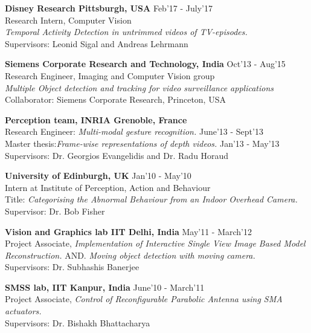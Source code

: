 \documentclass[line, margin]{res}
\begin{document}
\begin{resume}
\textbf{Disney Research Pittsburgh, USA} \hfill Feb'17 - July'17 \\
Research Intern, Computer Vision\\
\emph{Temporal Activity Detection in untrimmed videos of TV-episodes.}\\
Supervisors: Leonid Sigal and Andreas Lehrmann 

\textbf{Siemens Corporate Research and Technology, India} \hfill Oct'13 - Aug'15 \\
Research Engineer, Imaging and Computer Vision group\\
\emph{Multiple Object detection and tracking for video surveillance applications}\\
Collaborator: Siemens Corporate Research, Princeton, USA 

\textbf{Perception team, INRIA Grenoble, France}  \\
Research Engineer: %
{\emph{Multi-modal gesture recognition.}} \hfill June'13 - Sept'13 \\
Master thesis:\emph{Frame-wise representations of depth videos.} \hfill Jan'13 - May'13 \\
Supervisors: Dr. Georgios Evangelidis and Dr. Radu Horaud 

\textbf{University of Edinburgh, UK} \hfill Jan'10 - May'10 \\
Intern at %
{Institute of Perception, Action and Behaviour} \\ 
Title: \emph{Categorising the Abnormal Behaviour from an Indoor Overhead Camera.} \\
Supervisor:
{Dr. Bob Fisher} 

\textbf{Vision and Graphics lab IIT Delhi, India} \hfill May'11 - March'12 \\
Project Associate, \emph{Implementation of Interactive Single View Image Based Model Reconstruction.} AND. 
\emph{Moving object detection with moving camera.} \\
Supervisors: Dr. Subhashis Banerjee

\textbf{SMSS lab, IIT Kanpur, India} \hfill June'10 - March'11 \\
Project Associate, \emph{Control of Reconfigurable Parabolic Antenna using SMA actuators.}\\
Supervisors: Dr. Bishakh Bhattacharya\\



\end{resume}
\end{document}
